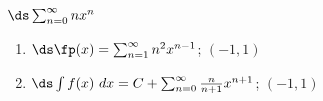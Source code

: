 {$\ds\sum_{n=0}^\infty nx^n$
}
{\begin{enumerate}
	\item $\ds \fp(x) =  \sum_{n=1}^\infty n^2x^{n-1}$; \quad $(-1,1)$
	\item	$\ds \int f(x)\ dx = C+\sum_{n=0}^\infty \frac{n}{n+1}x^{n+1}$; \quad $(-1,1)$
\end{enumerate}
}